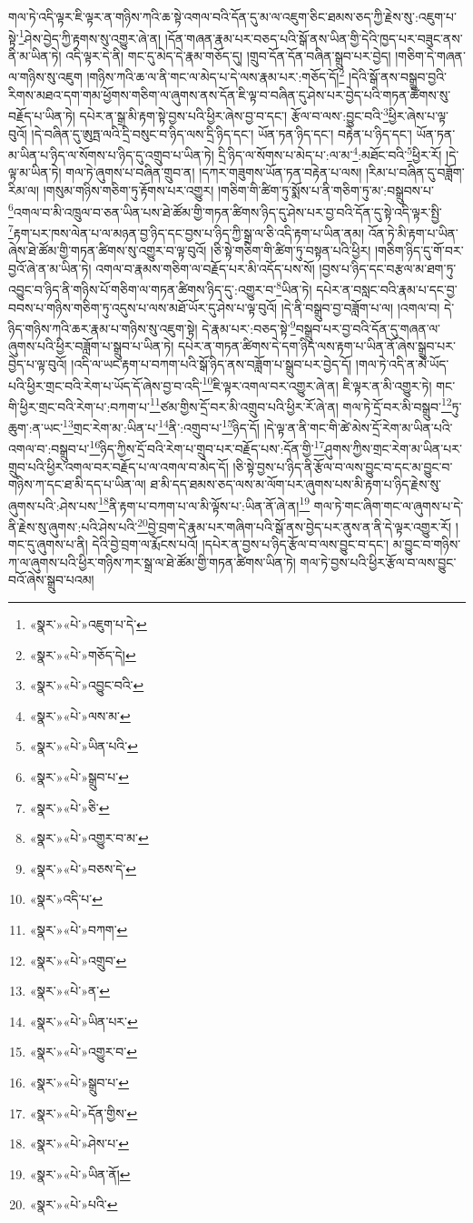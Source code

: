 གལ་ཏེ་འདི་ལྟར་ཇི་ལྟར་ན་གཉིས་ཀའི་ཆ་སྟེ་འགལ་བའི་དོན་དུ་མ་ལ་འཇུག་ཅིང་ཐམས་ཅད་ཀྱི་རྗེས་སུ་:འཇུག་པ་སྟེ་\footnote{«སྣར་»«པེ་»འཇུག་པ་དེ་}ཤེས་བྱེད་ཀྱི་རྟགས་སུ་འགྱུར་ཞེ་ན། །དོན་གཞན་རྣམ་པར་བཅད་པའི་སྒོ་ནས་ཡིན་གྱི་དེའི་ཁྱད་པར་བཟུང་ནས་ནི་མ་ཡིན་ཏེ། འདི་ལྟར་དེ་ནི། གང་དུ་མེད་དེ་རྣམ་གཅོད་དུ། །གྲུབ་དོན་དོན་བཞིན་སྒྲུབ་པར་བྱེད། །གཅིག་དེ་གཞན་ལ་གཉིས་སུ་འཇུག །གཉིས་ཀའི་ཆ་ལ་ནི་གང་ལ་མེད་པ་དེ་ལས་རྣམ་པར་:གཅོད་དོ།\footnote{«སྣར་»«པེ་»གཅོད་དེ།} །དེའི་སྒོ་ནས་བསྒྲུབ་བྱའི་རིགས་མཐའ་དག་གམ་ཕྱོགས་གཅིག་ལ་ཞུགས་ནས་དོན་ཇི་ལྟ་བ་བཞིན་དུ་ཤེས་པར་བྱེད་པའི་གཏན་ཚིགས་སུ་བརྗོད་པ་ཡིན་ཏེ། དཔེར་ན་སྒྲ་མི་རྟག་སྟེ་བྱས་པའི་ཕྱིར་ཞེས་བྱ་བ་དང་། རྩོལ་བ་ལས་:བྱུང་བའི་\footnote{«སྣར་»«པེ་»འབྱུང་བའི་}ཕྱིར་ཞེས་པ་ལྟ་བུའོ། །དེ་བཞིན་དུ་ཨུཏྤ་ལའི་དྲི་བསུང་བ་ཉིད་ལས་དྲི་ཉིད་དང་། ཡོན་ཏན་ཉིད་དང་། བརྟེན་པ་ཉིད་དང་། ཡོན་ཏན་མ་ཡིན་པ་ཉིད་ལ་སོགས་པ་ཉིད་དུ་འགྲུབ་པ་ཡིན་ཏེ། དྲི་ཉིད་ལ་སོགས་པ་མེད་པ་:ལ་མ་\footnote{«སྣར་»«པེ་»ལས་མ་}:མཐོང་བའི་\footnote{«སྣར་»«པེ་»ཡིན་པའི་}ཕྱིར་རོ། །དེ་ལྟ་མ་ཡིན་ཏེ། གལ་ཏེ་ཞུགས་པ་བཞིན་གྲུབ་ན། །དཀར་གཟུགས་ཡོན་ཏན་བརྟེན་པ་ལས། །རིམ་པ་བཞིན་དུ་བཟློག་རིམ་ལ། །གསུམ་གཉིས་གཅིག་ཏུ་རྟོགས་པར་འགྱུར། །གཅིག་གི་ཚིག་ཏུ་སྨོས་པ་ནི་གཅིག་ཏུ་མ་:བསྒྲུབས་པ་\footnote{«སྣར་»«པེ་»སྒྲུབ་པ་}འགལ་བ་མི་འཁྲུལ་བ་ཅན་ཡིན་པས་ཐེ་ཚོམ་གྱི་གཏན་ཚིགས་ཉིད་དུ་ཤེས་པར་བྱ་བའི་དོན་དུ་སྟེ་འདི་ལྟར་སྤྱི་\footnote{«སྣར་»«པེ་»ཅི་}རྟག་པར་ཁས་ལེན་པ་ལ་མཉན་བྱ་ཉིད་དང་བྱས་པ་ཉིད་ཀྱི་སྒྲ་ལ་ཅི་འདི་རྟག་པ་ཡིན་ནམ། འོན་ཏེ་མི་རྟག་པ་ཡིན་ཞེས་ཐེ་ཚོམ་གྱི་གཏན་ཚིགས་སུ་འགྱུར་བ་ལྟ་བུའོ། །ཅི་སྟེ་གཅིག་གི་ཚིག་ཏུ་བསྟན་པའི་ཕྱིར། །གཅིག་ཉིད་དུ་གོ་བར་བྱའོ་ཞེ་ན་མ་ཡིན་ཏེ། འགལ་བ་རྣམས་གཅིག་ལ་བརྗོད་པར་མི་འདོད་པས་སོ། །བྱས་པ་ཉིད་དང་བརྩལ་མ་ཐག་ཏུ་འབྱུང་བ་ཉིད་ནི་གཉིས་པོ་གཅིག་ལ་གཏན་ཚིགས་ཉིད་དུ་:འགྱུར་བ་\footnote{«སྣར་»«པེ་»འགྱུར་བ་མ་}ཡིན་ཏེ། དཔེར་ན་བསླང་བའི་རྣམ་པ་དང་བྱ་བབས་པ་གཉིས་གཅིག་ཏུ་འདུས་པ་ལས་མཐོ་ཡོར་དུ་ཤེས་པ་ལྟ་བུའོ། །དེ་ནི་བསྒྲུབ་བྱ་བཟློག་པ་ལ། །འགལ་བ། དེ་ཉིད་གཉིས་ཀའི་ཆར་རྣམ་པ་གཉིས་སུ་འཇུག་སྟེ། དེ་རྣམ་པར་:བཅད་སྟེ་\footnote{«སྣར་»«པེ་»བཅས་དེ་}བསྒྲུབ་པར་བྱ་བའི་དོན་དུ་གཞན་ལ་ཞུགས་པའི་ཕྱིར་བཟློག་པ་སྒྲུབ་པ་ཡིན་ཏེ། དཔེར་ན་གཏན་ཚིགས་དེ་དག་ཉིད་ལས་རྟག་པ་ཡིན་ནོ་ཞེས་སྒྲུབ་པར་བྱེད་པ་ལྟ་བུའོ། །འདི་ལ་ཡང་རྟག་པ་བཀག་པའི་སྒོ་ཉིད་ནས་བཟློག་པ་སྒྲུབ་པར་བྱེད་དོ། །གལ་ཏེ་འདི་ན་མེ་ཡོད་པའི་ཕྱིར་གྲང་བའི་རེག་པ་ཡོད་དོ་ཞེས་བྱ་བ་འདི་\footnote{«སྣར་»འདི་པ་}ཇི་ལྟར་འགལ་བར་འགྱུར་ཞེ་ན། ཇི་ལྟར་ན་མི་འགྱུར་ཏེ། གང་གི་ཕྱིར་གྲང་བའི་རེག་པ་:བཀག་པ་\footnote{«སྣར་»«པེ་»བཀག་}ཙམ་གྱིས་དྲོ་བར་མི་འགྲུབ་པའི་ཕྱིར་རོ་ཞེ་ན། གལ་ཏེ་དྲོ་བར་མི་བསྒྲུབ་\footnote{«སྣར་»«པེ་»འགྲུབ་}ཏུ་ཆུག་:ན་ཡང་\footnote{«སྣར་»«པེ་»ན་}གྲང་རེག་མ་:ཡིན་པ་\footnote{«སྣར་»«པེ་»ཡིན་པར་}ནི་:འགྲུབ་པ་\footnote{«སྣར་»«པེ་»འགྱུར་བ་}ཉིད་དོ། །དེ་ལྟ་ན་ནི་གང་གི་ཚེ་མེས་དྲོ་རེག་མ་ཡིན་པའི་འགལ་བ་:བསྒྲུབ་པ་\footnote{«སྣར་»«པེ་»སྒྲུབ་པ་}ཉིད་ཀྱིས་དྲོ་བའི་རེག་པ་གྲུབ་པར་བརྗོད་པས་:དོན་གྱི་\footnote{«སྣར་»«པེ་»དོན་གྱིས་}ཤུགས་ཀྱིས་གྲང་རེག་མ་ཡིན་པར་གྲུབ་པའི་ཕྱིར་འགལ་བར་བརྗོད་པ་ལ་འགལ་བ་མེད་དོ། །ཅི་སྟེ་བྱས་པ་ཉིད་ནི་རྩོལ་བ་ལས་བྱུང་བ་དང་མ་བྱུང་བ་གཉིས་ཀ་དང་ཐ་མི་དད་པ་ཡིན་ལ། ཐ་མི་དད་ཐམས་ཅད་ལས་མ་ལོག་པར་ཞུགས་པས་མི་རྟག་པ་ཉིད་རྗེས་སུ་ཞུགས་པའི་:ཤེས་པས་\footnote{«སྣར་»«པེ་»ཤེས་པ་}ནི་རྟག་པ་བཀག་པ་ལ་མི་ལྟོས་པ་:ཡིན་ནོ་ཞེ་ན།\footnote{«སྣར་»«པེ་»ཡིན་ནོ།} གལ་ཏེ་གང་ཞིག་གང་ལ་ཞུགས་པ་དེ་ནི་རྗེས་སུ་ཞུགས་:པའི་ཤེས་པའི་\footnote{«སྣར་»«པེ་»པའི་}བྱེ་བྲག་དེ་རྣམ་པར་གཞིག་པའི་སྒོ་ནས་བྱེད་པར་ནུས་ན་ནི་དེ་ལྟར་འགྱུར་རོ། །གང་དུ་ཞུགས་པ་ནི། དེའི་བྱེ་བྲག་ལ་རྨོངས་པའོ། །དཔེར་ན་བྱས་པ་ཉིད་རྩོལ་བ་ལས་བྱུང་བ་དང་། མ་བྱུང་བ་གཉིས་ཀ་ལ་ཞུགས་པའི་ཕྱིར་གཉིས་ཀར་སྒྲ་ལ་ཐེ་ཚོམ་གྱི་གཏན་ཚིགས་ཡིན་ཏེ། གལ་ཏེ་བྱས་པའི་ཕྱིར་རྩོལ་བ་ལས་བྱུང་བའོ་ཞེས་སྒྲུབ་པའམ། 